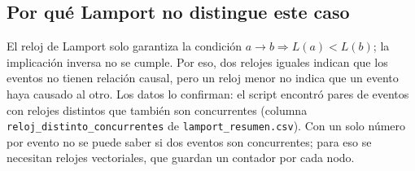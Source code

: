 \begin{table}[ht]
\centering
\caption{Ejemplos de eventos concurrentes con igual reloj (generada por el script).}
\label{tab:concurrentes}
\resizebox{\textwidth}{!}{}
\end{table}

\subsection{Por qué Lamport no distingue este caso}
El reloj de Lamport solo garantiza la condición
$a \rightarrow b \Rightarrow L(a) < L(b)$; la implicación inversa no se cumple.
Por eso, dos relojes iguales indican que los eventos no tienen relación causal,
pero un reloj menor no indica que un evento haya causado al otro. Los datos lo
confirman: el script encontró pares de eventos con relojes distintos que también
son concurrentes (columna \texttt{reloj\_distinto\_concurrentes} de
\texttt{lamport\_resumen.csv}). Con un solo número por evento no se puede saber
si dos eventos son concurrentes; para eso se necesitan relojes vectoriales, que
guardan un contador por cada nodo.
